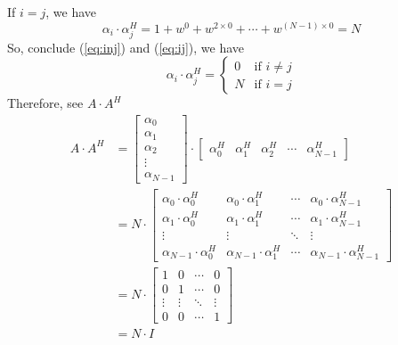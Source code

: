 \documentclass{article}
\begin{document}
If $i = j$, we have
\begin{equation}
    \alpha_i \cdot \alpha_j^H = 1 + w^{0} + w^{2 \times 0} + \cdots + w^{(N - 1) \times 0} = N
    \label{eq:ij}
\end{equation}
So, conclude (\ref{eq:inj}) and (\ref{eq:ij}), we have
\begin{equation}
    \alpha_i \cdot \alpha_j^H =
    \begin{cases}
        0 & \text{if } i \neq j \\ 
        N & \text{if } i = j
    \end{cases}
\label{eq:multi_ij}
\end{equation}
Therefore, see $A \cdot A^H$
\begin{equation}
\begin{aligned}
    A \cdot A^H &= 
    \begin{bmatrix}
        \alpha_0 \\ \alpha_1 \\ \alpha_2 \\ \vdots \\ \alpha_{N - 1}
    \end{bmatrix}
    \cdot
    \begin{bmatrix}
        \alpha_0^H & \alpha_1^H & \alpha_2^H & \cdots & \alpha_{N - 1}^H
    \end{bmatrix} \\ 
    &= N \cdot 
    \begin{bmatrix}
        \alpha_0 \cdot \alpha_0^H & \alpha_0 \cdot \alpha_1^H & \cdots & \alpha_0 \cdot \alpha_{N - 1}^H \\ 
        \alpha_1 \cdot \alpha_0^H & \alpha_1 \cdot \alpha_1^H & \cdots & \alpha_1 \cdot \alpha_{N - 1}^H \\ 
        \vdots & \vdots & \ddots & \vdots \\ 
        \alpha_{N - 1} \cdot \alpha_0^H & \alpha_{N - 1} \cdot \alpha_1^H & \cdots & \alpha_{N - 1} \cdot \alpha_{N - 1}^H
    \end{bmatrix} \\
    &= N \cdot 
    \begin{bmatrix}
        1 & 0 & \cdots & 0 \\ 
        0 & 1 & \cdots & 0 \\ 
        \vdots & \vdots & \ddots & \vdots \\ 
        0 & 0 & \cdots & 1
    \end{bmatrix} \\
    &= N \cdot I
\end{aligned}
\label{eq:AAH}
\end{equation}
\end{document}
